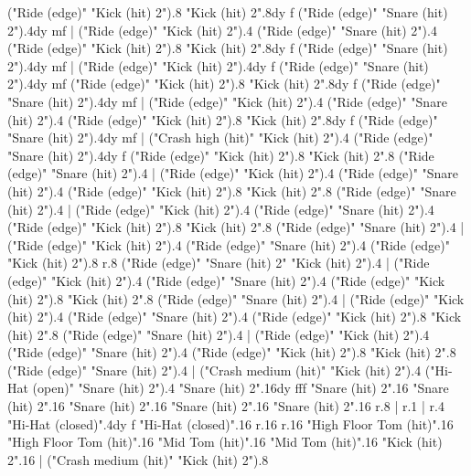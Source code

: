       ("Ride (edge)" "Kick (hit) 2").8
      "Kick (hit) 2".8{dy f}
      ("Ride (edge)" "Snare (hit) 2").4{dy mf}
    |
      ("Ride (edge)" "Kick (hit) 2").4
      ("Ride (edge)" "Snare (hit) 2").4
      ("Ride (edge)" "Kick (hit) 2").8
      "Kick (hit) 2".8{dy f}
      ("Ride (edge)" "Snare (hit) 2").4{dy mf}
    |
      ("Ride (edge)" "Kick (hit) 2").4{dy f}
      ("Ride (edge)" "Snare (hit) 2").4{dy mf}
      ("Ride (edge)" "Kick (hit) 2").8
      "Kick (hit) 2".8{dy f}
      ("Ride (edge)" "Snare (hit) 2").4{dy mf}
    |
      ("Ride (edge)" "Kick (hit) 2").4
      ("Ride (edge)" "Snare (hit) 2").4
      ("Ride (edge)" "Kick (hit) 2").8
      "Kick (hit) 2".8{dy f}
      ("Ride (edge)" "Snare (hit) 2").4{dy mf}
    |
      ("Crash high (hit)" "Kick (hit) 2").4
      ("Ride (edge)" "Snare (hit) 2").4{dy f}
      ("Ride (edge)" "Kick (hit) 2").8
      "Kick (hit) 2".8
      ("Ride (edge)" "Snare (hit) 2").4
    |
      ("Ride (edge)" "Kick (hit) 2").4
      ("Ride (edge)" "Snare (hit) 2").4
      ("Ride (edge)" "Kick (hit) 2").8
      "Kick (hit) 2".8
      ("Ride (edge)" "Snare (hit) 2").4
    |
      ("Ride (edge)" "Kick (hit) 2").4
      ("Ride (edge)" "Snare (hit) 2").4
      ("Ride (edge)" "Kick (hit) 2").8
      "Kick (hit) 2".8
      ("Ride (edge)" "Snare (hit) 2").4
    |
      ("Ride (edge)" "Kick (hit) 2").4
      ("Ride (edge)" "Snare (hit) 2").4
      ("Ride (edge)" "Kick (hit) 2").8
      r.8
      ("Ride (edge)" "Snare (hit) 2" "Kick (hit) 2").4
    |
      ("Ride (edge)" "Kick (hit) 2").4
      ("Ride (edge)" "Snare (hit) 2").4
      ("Ride (edge)" "Kick (hit) 2").8
      "Kick (hit) 2".8
      ("Ride (edge)" "Snare (hit) 2").4
    |
      ("Ride (edge)" "Kick (hit) 2").4
      ("Ride (edge)" "Snare (hit) 2").4
      ("Ride (edge)" "Kick (hit) 2").8
      "Kick (hit) 2".8
      ("Ride (edge)" "Snare (hit) 2").4
    |
      ("Ride (edge)" "Kick (hit) 2").4
      ("Ride (edge)" "Snare (hit) 2").4
      ("Ride (edge)" "Kick (hit) 2").8
      "Kick (hit) 2".8
      ("Ride (edge)" "Snare (hit) 2").4
    |
      ("Crash medium (hit)" "Kick (hit) 2").4
      ("Hi-Hat (open)" "Snare (hit) 2").4
      "Snare (hit) 2".16{dy fff}
      "Snare (hit) 2".16
      "Snare (hit) 2".16
      "Snare (hit) 2".16
      "Snare (hit) 2".16
      "Snare (hit) 2".16
      r.8
    |
      r.1
    |
      r.4
      "Hi-Hat (closed)".4{dy f}
      "Hi-Hat (closed)".16
      r.16
      r.16
      "High Floor Tom (hit)".16
      "High Floor Tom (hit)".16
      "Mid Tom (hit)".16
      "Mid Tom (hit)".16
      "Kick (hit) 2".16
    |
      ("Crash medium (hit)" "Kick (hit) 2").8
